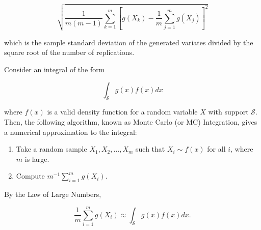 \documentclass[
  letterpaper,
  DIV=11,
  numbers=noendperiod]{scrreprt}
\providecommand{\tightlist}{%
  \setlength{\itemsep}{0pt}\setlength{\parskip}{0pt}}\usepackage{longtable,booktabs,array}
\theoremstyle{definition}
\theoremstyle{plain}
\theoremstyle{definition}
\theoremstyle{remark}
\begin{document}
\[\sqrt{\frac{1}{m(m-1)} \sum_{k=1}^{m} \left[g\left(X_k\right) - \frac{1}{m} \sum_{j=1}^{m} g\left(X_j\right)\right]^2}\]

which is the sample standard deviation of the generated variates divided
by the square root of the number of replications.

\begin{description}
\tightlist
\item[Monte Carlo Integration (Definition~\ref{def-mc-integration})]
Consider an integral of the form
\end{description}

\[\int_{\mathcal{S}} g(x) f(x) dx\]

where \(f(x)\) is a valid density function for a random variable \(X\)
with support \(\mathcal{S}\). Then, the following algorithm, known as
Monte Carlo (or MC) Integration, gives a numerical approximation to the
integral:

\begin{enumerate}
\def\labelenumi{\arabic{enumi}.}
\tightlist
\item
  Take a random sample \(X_1, X_2, \dotsc, X_m\) such that
  \(X_i \sim f(x)\) for all \(i\), where \(m\) is large.
\item
  Compute \(m^{-1} \sum_{i=1}^{m} g\left(X_i\right)\).
\end{enumerate}

By the Law of Large Numbers,

\[\frac{1}{m} \sum_{i=1}^{m} g\left(X_i\right) \approx \int_{\mathcal{S}} g(x) f(x) dx.\]
\end{document}
